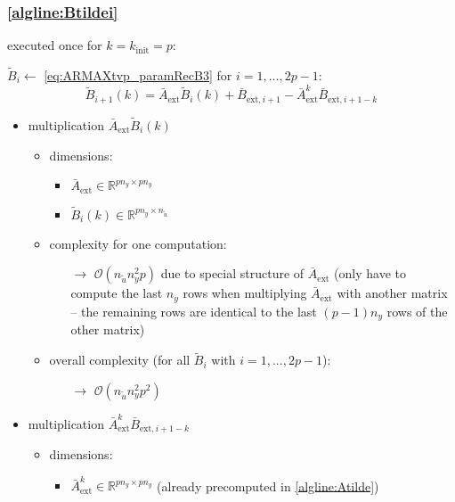 \documentclass{article}
\begin{document}
\subsubsection{\cref{algline:Btildei}} \label{sec:line4}
executed once for $k=k_{\text{init}}=p$:

$\tilde{B}_i \gets$ \cref{eq:ARMAXtvp_paramRecB3}{ \small for $i=1,...,2p-1$}:
$$\tilde{B}_{i+1}(k) = \bar{A}_\text{ext}\tilde{B}_{i}(k) + \bar{B}_{\text{ext},i+1} - \bar{A}_\text{ext}^{k}\bar{B}_{\text{ext},i+1-k}$$
\begin{itemize}
    \item multiplication $\bar{A}_\text{ext}\tilde{B}_{i}(k)$
    \begin{itemize}
        \item dimensions:
        \begin{itemize}
            \item $\bar{A}_\text{ext} \in \mathbb{R}^{pn_y \times pn_y}$
            \item $\tilde{B}_{i}(k) \in \mathbb{R}^{pn_y \times n_{\tilde{u}}}$
        \end{itemize}
        \item complexity for one computation:
        \begin{itemize}
            \item[$\rightarrow$] $\mathcal{O}(n_{\tilde{u}} n_y^2 p)$ due to special structure of $\bar{A}_\text{ext}$ (only have to compute the last $n_y$ rows when multiplying $\bar{A}_\text{ext}$ with another matrix -- the remaining rows are identical to the last $(p-1)n_y$ rows of the other matrix)
        \end{itemize}    
        \item overall complexity (for all $\tilde{B}_i$ with $i=1,...,2p-1$):
        \begin{itemize}
            \item[$\rightarrow$] $\mathcal{O}(n_{\tilde{u}} n_y^2 p^2)$
        \end{itemize}
    \end{itemize}
    \item multiplication $\bar{A}_\text{ext}^{k}\bar{B}_{\text{ext},i+1-k}$
    \begin{itemize}
        \item dimensions:
        \begin{itemize}
            \item $\bar{A}_\text{ext}^k \in \mathbb{R}^{pn_y \times pn_y}$ (already precomputed in \cref{algline:Atilde}) 

\end{itemize}
\end{itemize}
\end{itemize}
\end{document}
